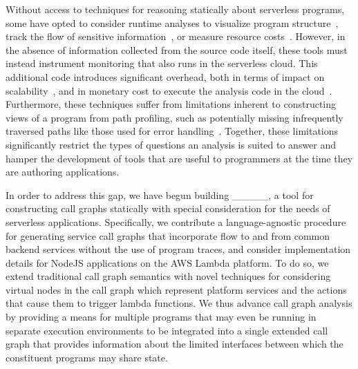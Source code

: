 \documentclass[letterpaper,twocolumn,10pt]{article}
\begin{document}
Without access to techniques for reasoning statically about serverless programs, some have opted to consider runtime analyses to visualize program structure~\cite{lowgo,causalorder}, track the flow of sensitive information~\cite{ifc}, or measure resource costs~\cite{curtain}. However, in the absence of information collected from the source code itself, these tools must instead instrument monitoring that also runs in the serverless cloud. This additional code introduces significant overhead, both in terms of impact on scalability~\cite{causalorder}, and in monetary cost to execute the analysis code in the cloud~\cite{serverlesscost}. Furthermore, these techniques suffer from limitations inherent to constructing views of a program from path profiling, such as potentially missing infrequently traversed paths like those used for error handling~\cite{selectivepaths}. Together, these limitations significantly restrict the types of questions an analysis is suited to answer and hamper the development of tools that are useful to programmers at the time they are authoring applications. \par

In order to address this gap, we have begun building \_\_\_\_\_, a tool for constructing call graphs statically with special consideration for the needs of serverless applications. Specifically, we contribute a language-agnostic procedure for generating service call graphs that incorporate flow to and from common backend services without the use of program traces, and consider implementation details for NodeJS applications on the AWS Lambda platform. To do so, we extend traditional call graph semantics with novel techniques for considering virtual nodes in the call graph which represent platform services and the actions that cause them to trigger lambda functions. We thus advance call graph analysis by providing a means for multiple programs that may even be running in separate execution environments to be integrated into a single extended call graph that provides information about the limited interfaces between which the constituent programs may share state. \par




\end{document}
